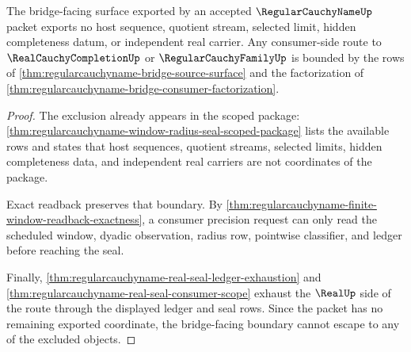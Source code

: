\begin{theorem}
\label{thm:regularcauchyname-bridge-non-escape-boundary}
The bridge-facing surface exported by an accepted $\RegularCauchyNameUp$ packet exports no host sequence, quotient stream, selected limit, hidden completeness datum, or independent real carrier. Any consumer-side route to $\RealCauchyCompletionUp$ or $\RegularCauchyFamilyUp$ is bounded by the rows of \autoref{thm:regularcauchyname-bridge-source-surface} and the factorization of \autoref{thm:regularcauchyname-bridge-consumer-factorization}.
\end{theorem}
\begin{proof}
The exclusion already appears in the scoped package: \autoref{thm:regularcauchyname-window-radius-seal-scoped-package} lists the available rows and states that host sequences, quotient streams, selected limits, hidden completeness data, and independent real carriers are not coordinates of the package.

Exact readback preserves that boundary. By \autoref{thm:regularcauchyname-finite-window-readback-exactness}, a consumer precision request can only read the scheduled window, dyadic observation, radius row, pointwise classifier, and ledger before reaching the seal.

Finally, \autoref{thm:regularcauchyname-real-seal-ledger-exhaustion} and \autoref{thm:regularcauchyname-real-seal-consumer-scope} exhaust the $\RealUp$ side of the route through the displayed ledger and seal rows. Since the packet has no remaining exported coordinate, the bridge-facing boundary cannot escape to any of the excluded objects.
\end{proof}

